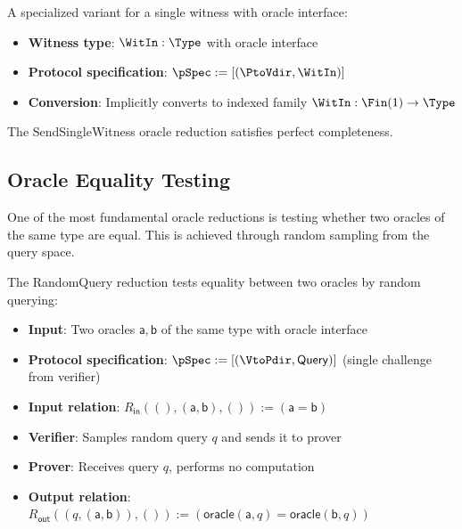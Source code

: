 \begin{definition}
    \label{def:sendsinglewitness_oracle_reduction}
    A specialized variant for a single witness with oracle interface:
    \begin{itemize}
        \item \textbf{Witness type}: $\WitIn : \Type$ with oracle interface
        \item \textbf{Protocol specification}: $\pSpec := [(\PtoVdir, \WitIn)]$
        \item \textbf{Conversion}: Implicitly converts to indexed family $\WitIn : \Fin(1) \to \Type$
    \end{itemize}
\end{definition}

\begin{theorem}
    The SendSingleWitness oracle reduction satisfies perfect completeness.
\end{theorem}

\subsection{Oracle Equality Testing}

One of the most fundamental oracle reductions is testing whether two oracles of the same type are equal. This is achieved through random sampling from the query space.

\begin{definition}
    \label{def:randomquery_oracle_reduction}
    The RandomQuery reduction tests equality between two oracles by random querying:
    \begin{itemize}
        \item \textbf{Input}: Two oracles $\mathsf{a}, \mathsf{b}$ of the same type with oracle interface
        \item \textbf{Protocol specification}: $\pSpec := [(\VtoPdir, \mathsf{Query})]$ (single challenge from verifier)
        \item \textbf{Input relation}: $R_{\mathsf{in}}((), (\mathsf{a}, \mathsf{b}), ()) := (\mathsf{a} = \mathsf{b})$
        \item \textbf{Verifier}: Samples random query $q$ and sends it to prover
        \item \textbf{Prover}: Receives query $q$, performs no computation
        \item \textbf{Output relation}: $R_{\mathsf{out}}((q, (\mathsf{a}, \mathsf{b})), ()) := (\mathsf{oracle}(\mathsf{a}, q) = \mathsf{oracle}(\mathsf{b}, q))$
    \end{itemize}
\end{definition}

